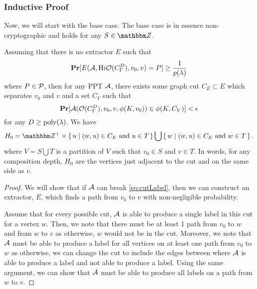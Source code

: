 \subsubsection*{Inductive Proof}
Now, we will start with the base case. The base case is in essence non-cryptographic and holds for any $S \in \Z$.
\begin{lemma}
	\label{lemma:cutBaseCase}
	Assuming that there is no extractor $E$ such that 
	$$\operatorname*{\mathbf{Pr}}[E(\mathcal{A},\text{H}i\mathcal{O}({C_\Gamma^D}), v_0, v) = P] \geq \frac{1}{p(\lambda)}$$
	where $P \in \mathcal{P}$, then for any PPT $\mathcal{A}$, there exists some graph cut
	$C_E \subset E$ which separates $v_0$ and $v$ and a set $C_V$ such that
	\begin{equation}
		\label{eq:cutLabel}
		\operatorname*{\mathbf{Pr}}[\mathcal{A}(\mathcal{O}({C_\Gamma^D}), v_0, v, \phi(K, v_0)) \in \phi(K, C_V)] < \epsilon
	\end{equation}
	for any $D \geq \operatorname{poly}(\lambda)$.
	We have
	\begin{equation*}
		H_0 = \Z^+ \times \set{ u \mid (w, u) \in C_E \text{ and } u \in T} \bigcup \set{ w \mid (w, u) \in C_E \text{ and } w \in T}.
	\end{equation*}
	where $V = S \bigcup T$ is a partition of $V$ such that $v_0 \in S$ and $v \in T$.
	In words, for any composition depth, $H_0$ are the vertices just adjacent to the cut and on the same side as $v$.
	\begin{proof}
		We will show that if $\mathcal{A}$ can break \cref{eq:cutLabel}, then we can construct an extractor,
		$E$, which finds a path from $v_0$ to $v$ with non-negligible probability.

		Assume that for every possible cut, $\mathcal{A}$ is able to produce a single label in this cut for a vertex $w$.
		Then, we note that there must be at least 1 path from $v_0$ to $w$ and from $w$ to $v$ as otherwise, $w$ would not be in the cut.
		Moreover, we note that $\mathcal{A}$ must be able to produce a label for all vertices on at least one path
		from $v_0$ to $w$ as otherwise, we can change the cut to include the edges between where
		$\mathcal{A}$ is able to produce a label and not able to produce a label. Using the same argument,
		we can show that $\mathcal{A}$ must be able to produce all labels on a path from $w$ to $v$.


\end{proof}
\end{lemma}
